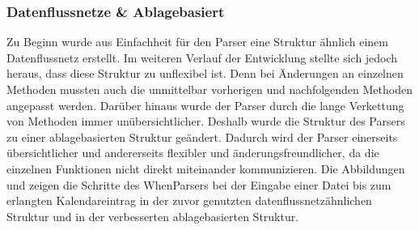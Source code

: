 \subsubsection{Datenflussnetze \& Ablagebasiert}
Zu Beginn wurde aus Einfachheit für den Parser eine Struktur ähnlich einem Datenflussnetz erstellt. %
	Im weiteren Verlauf der Entwicklung stellte sich jedoch heraus, dass diese Struktur zu unflexibel ist. %
		Denn bei Änderungen an einzelnen Methoden mussten auch die unmittelbar vorherigen und nachfolgenden Methoden angepasst werden. %
	Darüber hinaus wurde der Parser durch die lange Verkettung von Methoden immer unübersichtlicher.
Deshalb wurde die Struktur des Parsers zu einer ablagebasierten Struktur geändert. %
	Dadurch wird der Parser einerseits übersichtlicher und andererseits flexibler und änderungsfreundlicher, da die einzelnen Funktionen nicht direkt miteinander kommunizieren. %
Die Abbildungen \myTodo und \myTodo zeigen die Schritte des WhenParsers bei der Eingabe einer Datei bis zum erlangten Kalendareintrag in der zuvor genutzten datenflussnetzähnlichen Struktur und in der verbesserten ablagebasierten Struktur.
%
%
%
%
%